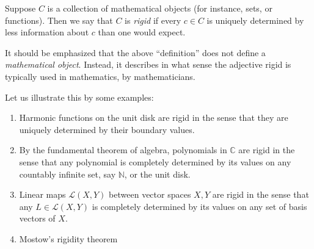 \documentclass[12pt]{article}
\newcommand{\sC}[0]{\mathbb{C}}
\newcommand{\sN}[0]{\mathbb{N}}
\begin{document}
Suppose $C$ is a collection of mathematical objects 
(for instance, sets, or functions).
Then we say that $C$ is \emph{rigid} if every $c\in C$ 
is uniquely determined by less information about $c$ than 
one would expect.

It should be emphasized that the above ``definition''  does not
define a \emph{mathematical object}. Instead, it describes in what sense
the adjective rigid is typically used in mathematics, 
by mathematicians. 

Let us illustrate this by some examples:

\begin{enumerate}
\item Harmonic functions on the unit disk are rigid in the sense that
 they are uniquely determined by their boundary values. 
\item By the fundamental theorem of algebra, polynomials in $\sC$
are rigid in the sense that any polynomial is completely determined by
its values on any countably infinite set, say $\sN$, or the unit disk. 
\item Linear maps $\mathscr{L}(X,Y)$ between vector spaces $X,Y$
are rigid in the sense that any $L\in\mathscr{L}(X,Y)$ is completely 
determined by its values on any set of basis vectors of $X$. 
\item Mostow's rigidity theorem
\end{enumerate}
\end{document}
